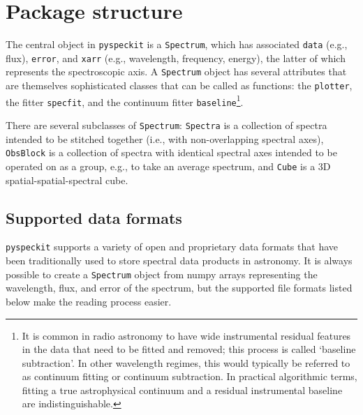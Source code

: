 \documentclass[twocolumn]{aastex62}
\newcommand{\pyspeckit}{\texttt{pyspeckit}\xspace}
\begin{document}
\section{Package structure}
\label{sec:basicstructure}
The central object in \pyspeckit is a \texttt{Spectrum}, which has
associated \texttt{data} (e.g., flux), \texttt{error}, and \texttt{xarr} (e.g., wavelength,
frequency, energy), the latter of
which represents the spectroscopic axis.  A \texttt{Spectrum} object has
several attributes that are themselves sophisticated classes that can be called
as functions: the \texttt{plotter}, the fitter \texttt{specfit}, and the
continuum fitter \texttt{baseline}\footnote{It is common in radio astronomy to
have wide instrumental residual features in the data that need to be fitted and
removed; this process is called `baseline subtraction'.  In other wavelength
regimes, this would typically be referred to as continuum fitting or continuum
subtraction.  In practical algorithmic terms, fitting a true astrophysical
continuum and a residual instrumental baseline are indistinguishable.}.

There are several subclasses of \texttt{Spectrum}: \texttt{Spectra}
is a collection of spectra intended to be stitched together (i.e., with
non-overlapping spectral axes), \texttt{ObsBlock} is a collection of spectra
with identical spectral axes intended to be operated on as a group, e.g., to
take an average spectrum, and \texttt{Cube} is a 3D spatial-spatial-spectral
cube.

\subsection{Supported data formats}

\pyspeckit supports a variety of open and proprietary data formats that have
been traditionally used to store spectral data products in astronomy. 
It is always possible to create a \texttt{Spectrum} object from numpy arrays
representing the wavelength, flux, and error of the spectrum, but
the supported file formats listed below make the reading process easier.
\end{document}
